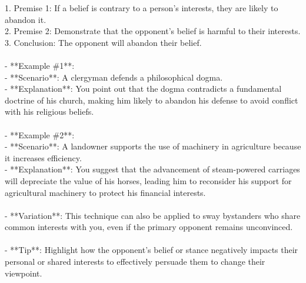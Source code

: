 \documentclass[a4paper,12pt,single,pdftex]{scrbook}
\begin{document}
    
        1. Premise 1: If a belief is contrary to a person's interests, they are likely to abandon it.
    \\

    
        2. Premise 2: Demonstrate that the opponent's belief is harmful to their interests.
    \\

    
        3. Conclusion: The opponent will abandon their belief.
    \\

    
      
    \\

    
      - **Example \#1**:
    \\

    
        - **Scenario**: A clergyman defends a philosophical dogma.
    \\

    
        - **Explanation**: You point out that the dogma contradicts a fundamental doctrine of his church, making him likely to abandon his defense to avoid conflict with his religious beliefs.
    \\

    
      
    \\

    
      - **Example \#2**:
    \\

    
        - **Scenario**: A landowner supports the use of machinery in agriculture because it increases efficiency.
    \\

    
        - **Explanation**: You suggest that the advancement of steam-powered carriages will depreciate the value of his horses, leading him to reconsider his support for agricultural machinery to protect his financial interests.
    \\

    
      
    \\

    
      - **Variation**: This technique can also be applied to sway bystanders who share common interests with you, even if the primary opponent remains unconvinced.
    \\

    
      
    \\

    
      - **Tip**: Highlight how the opponent’s belief or stance negatively impacts their personal or shared interests to effectively persuade them to change their viewpoint.
    \\
\end{document}
